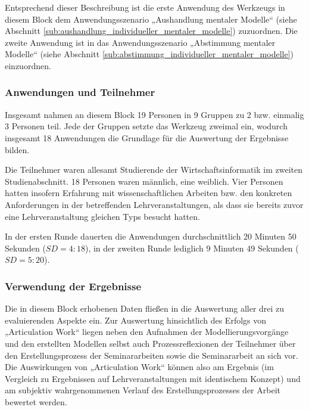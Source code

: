 Entsprechend dieser Beschreibung ist die erste Anwendung des Werkzeugs in diesem Block dem Anwendungsszenario „Aushandlung mentaler Modelle“ (siehe Abschnitt \ref{sub:aushandlung_individueller_mentaler_modelle}) zuzuordnen. Die zweite Anwendung ist in das Anwendungsszenario „Abstimmung mentaler Modelle“ (siehe Abschnitt \ref{sub:abstimmung_individueller_mentaler_modelle}) einzuordnen.

\subsubsection{Anwendungen und Teilnehmer} %
\label{ssub:2_teilnehmer}

Insgesamt nahmen an diesem Block 19 Personen in 9 Gruppen zu 2 bzw. einmalig 3 Personen teil. Jede der Gruppen setzte das Werkzeug zweimal ein, wodurch insgesamt 18 Anwendungen die Grundlage für die Auswertung der Ergebnisse bilden.

Die Teilnehmer waren allesamt Studierende der Wirtschaftsinformatik im zweiten Studienabschnitt. 18 Personen waren männlich, eine weiblich. Vier Personen hatten insofern Erfahrung mit wissenschaftlichen Arbeiten bzw. den konkreten Anforderungen in der betreffenden Lehrveranstaltungen, als dass sie bereits zuvor eine Lehrveranstaltung gleichen Typs besucht hatten.

In der ersten Runde dauerten die Anwendungen durchschnittlich 20 Minuten 50 Sekunden ($SD=4:18$), in der zweiten Runde lediglich 9 Minuten 49 Sekunden ($SD=5:20$).


\subsubsection{Verwendung der Ergebnisse} %
\label{ssub:2_verwendung_der_ergebnisse}

Die in diesem Block erhobenen Daten fließen in die Auswertung aller drei zu evaluierenden Aspekte ein. Zur Auswertung hinsichtlich des Erfolgs von „Articulation Work“ liegen neben den Aufnahmen der Modellierungsvorgänge und den erstellten Modellen selbst auch Prozessreflexionen der Teilnehmer über den Erstellungsprozess der Seminararbeiten sowie die Seminararbeit an sich vor. Die Auswirkungen von „Articulation Work“ können also am Ergebnis (im Vergleich zu Ergebnissen auf Lehrveranstaltungen mit identischem Konzept) und am subjektiv wahrgenommenen Verlauf des Erstellungsprozesses der Arbeit bewertet werden.

